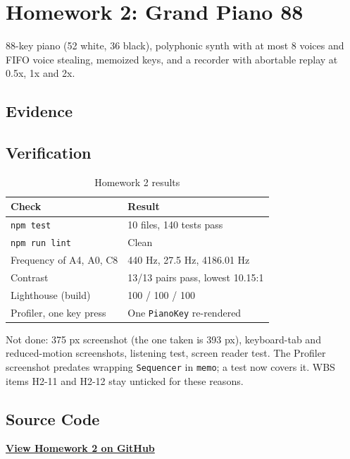 \chapter{Homework 2: Grand Piano 88}
\label{chap:hw2}

88-key piano (52 white, 36 black), polyphonic synth with at most 8 voices and FIFO voice stealing, memoized keys, and a recorder with abortable replay at 0.5x, 1x and 2x.

\section{Evidence}


\section{Verification}

\begin{table}[H]
\centering
\begin{tabular}{L{5.5cm} L{7.5cm}}
\toprule
\textbf{Check} & \textbf{Result} \\
\midrule
\texttt{npm test} & 10 files, 140 tests pass \\
\texttt{npm run lint} & Clean \\
Frequency of A4, A0, C8 & 440 Hz, 27.5 Hz, 4186.01 Hz \\
Contrast & 13/13 pairs pass, lowest 10.15:1 \\
Lighthouse (build) & 100 / 100 / 100 \\
Profiler, one key press & One \texttt{PianoKey} re-rendered \\
\bottomrule
\end{tabular}
\caption{Homework 2 results}
\label{tab:hw2-verify}
\end{table}

Not done: 375 px screenshot (the one taken is 393 px), keyboard-tab and reduced-motion screenshots, listening test, screen reader test. The Profiler screenshot predates wrapping \texttt{Sequencer} in \texttt{memo}; a test now covers it. WBS items H2-11 and H2-12 stay unticked for these reasons.

\section{Source Code}

\begin{center}
    \href{https://github.com/Prosperum26/24520626_QuangPhuHung_MSIS207_Lab03/tree/main/src/homeworks/GrandPiano88}
    {\textbf{View Homework 2 on GitHub}}
\end{center}
